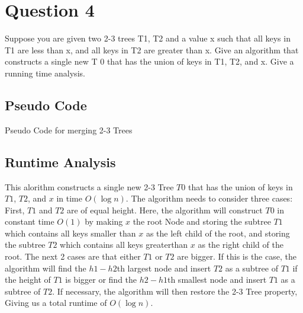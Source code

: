\documentclass{article}
\begin{document}
\section*{Question 4}
Suppose you are given two 2-3 trees T1, T2 and a value x such
that all keys in T1 are less than x, and all keys in T2 are greater than x.
Give an algorithm that constructs a single new T
0 that has the union of keys in T1, T2, and x. Give a running time analysis.
\newpage

\subsection*{Pseudo Code}
\begin{algorithm}
\begin{algorithmic}
	\ENDFOR
	\ENDIF
	\ENDFOR
	\ENDIF
\ENDIF

\end{algorithmic}
\caption{Pseudo Code for merging 2-3 Trees}
\end{algorithm}

\subsection*{Runtime Analysis}
This alorithm constructs a single new 2-3 Tree
$T0$ that has the union of keys in $T1$, $T2$, and $x$
in time $O{(\log n)}$. The algorithm needs to consider three cases:
First, $T1$ and $T2$ are of equal height. Here, the algorithm
will construct $T0$ in constant time $O(1)$ by making $x$ the root Node 
and storing the subtree $T1$ which contains all keys smaller
than $x$ as the left child of the root, and storing the subtree $T2$ 
which contains all keys greaterthan $x$ as the right child of the root.
The next 2 cases are that either $T1$ or $T2$ are bigger. If this is the case,
the algorithm will find the $h1-h2$th largest node and insert $T2$ as a subtree
of $T1$ if the height of $T1$ is bigger or find the $h2-h1$th smallest node and 
insert $T1$ as a subtree of $T2$. If necessary, the algorithm will then restore 
the 2-3 Tree property, Giving us a total runtime of $O(\log n)$. 
\end{document}
